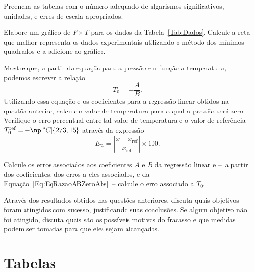 \begin{question}[type={exam}]{2}
Preencha as tabelas com o número adequado de algarismos significativos, unidades, e erros de escala apropriados. 
\end{question}

\begin{question}[type={exam}]{2}
Elabore um gráfico de $P \times T$ para os dados da Tabela~\ref{Tab:Dados}. Calcule a reta que melhor representa os dados experimentais utilizando o método dos mínimos quadrados e a adicione ao gráfico.
\end{question}

\begin{question}[type={exam}]{2}
Mostre que, a partir da equação para a pressão em função a temperatura, podemos escrever a relação
\begin{equation}\label{Eq:EqRazaoABZeroAbs}
	T_0 = -\frac{A}{B}.
\end{equation}
%
Utilizando essa equação e os coeficientes para a regressão linear obtidos na questão anterior, calcule o valor de temperatura para o qual a pressão será zero. Verifique o erro percentual entre tal valor de temperatura e o valor de referência $T_0^{\textrm{ref}} = -\np[\tcdegree C]{273,15}$ através da expressão
\begin{equation}
	E_{\%} = \left|\frac{x-x_{\textrm{ref}}}{x_{\textrm{ref}}}\right| \times 100.
\end{equation}
\end{question}

\begin{question}[type={exam}]{3}
Calcule os erros associados aos coeficientes $A$ e $B$ da regressão linear e --~a partir dos coeficientes, dos erros a eles associados, e da Equação~\ref{Eq:EqRazaoABZeroAbs}~--  calcule o erro associado a $T_0$.
\end{question}

\begin{question}[type={exam}]{2}
Através dos resultados obtidos nas questões anteriores, discuta quais objetivos foram atingidos com sucesso, justificando suas conclusões. Se algum objetivo não foi atingido, discuta quais são os possíveis motivos do fracasso e que medidas podem ser tomadas para que eles sejam alcançados.
\end{question}

\section{Tabelas}

